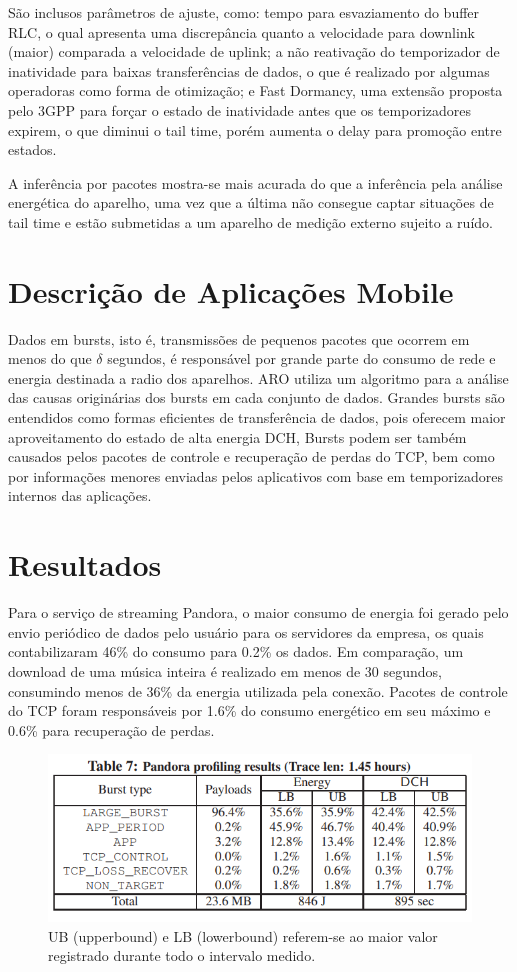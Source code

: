 \documentclass{article}
\begin{document}
São inclusos parâmetros de ajuste, como: tempo para esvaziamento do buffer RLC, o qual apresenta uma discrepância quanto
a velocidade para downlink (maior) comparada a velocidade de uplink; a não reativação do temporizador de inatividade
para baixas transferências de dados, o que é realizado por algumas operadoras como forma de otimização; e Fast Dormancy,
uma extensão proposta pelo 3GPP para forçar o estado de inatividade antes que os temporizadores expirem, o que diminui o
tail time, porém aumenta o delay para promoção entre estados.

A inferência por pacotes mostra-se mais acurada do que a inferência pela análise energética do aparelho, uma vez que a
última não consegue captar situações de tail time e estão submetidas a um aparelho de medição externo sujeito a ruído.

\section{Descrição de Aplicações Mobile}
Dados em bursts, isto é, transmissões de pequenos pacotes que ocorrem em menos do que $\delta$ segundos, é responsável por
grande parte do consumo de rede e energia destinada a radio dos aparelhos. ARO utiliza um algoritmo para a análise das
causas originárias dos bursts em cada conjunto de dados. Grandes bursts são entendidos como formas eficientes de
transferência de dados, pois oferecem maior aproveitamento do estado de alta energia DCH, Bursts podem ser também
causados pelos pacotes de controle e recuperação de perdas do TCP, bem como por informações menores enviadas pelos
aplicativos com base em temporizadores internos das aplicações. 

\section{Resultados}
Para o serviço de streaming Pandora, o maior consumo de energia foi gerado pelo envio periódico de dados pelo usuário
para os servidores da empresa, os quais contabilizaram 46\% do consumo para 0.2\% os dados. Em comparação, um download
de uma música inteira é realizado em menos de 30 segundos, consumindo menos de 36\% da energia utilizada pela conexão.
Pacotes de controle do TCP foram responsáveis por 1.6\% do consumo energético em seu máximo e 0.6\% para recuperação de
perdas.

\begin{figure}[!h]
\includegraphics[width=\textwidth]{tabela-pandora}
\caption{UB (upperbound) e LB (lowerbound) referem-se ao maior valor registrado durante todo o intervalo medido.}
\centering
\end{figure}
\end{document}
